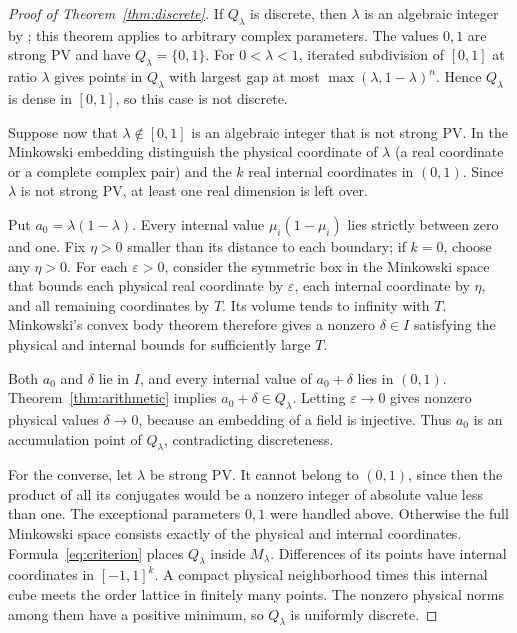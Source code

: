 \documentclass[11pt]{article}
\theoremstyle{remark}
\begin{document}
\begin{proof}[Proof of Theorem~\ref{thm:discrete}]
If $Q_\lambda$ is discrete, then $\lambda$ is an algebraic integer by \cite[Theorem~8.2]{FGH2020}; this theorem applies to arbitrary complex parameters. The values $0,1$ are strong PV and have $Q_\lambda=\{0,1\}$. For $0<\lambda<1$, iterated subdivision of $[0,1]$ at ratio $\lambda$ gives points in $Q_\lambda$ with largest gap at most $\max(\lambda,1-\lambda)^n$. Hence $Q_\lambda$ is dense in $[0,1]$, so this case is not discrete.

Suppose now that $\lambda\notin[0,1]$ is an algebraic integer that is not strong PV. In the Minkowski embedding distinguish the physical coordinate of $\lambda$ (a real coordinate or a complete complex pair) and the $k$ real internal coordinates in $(0,1)$. Since $\lambda$ is not strong PV, at least one real dimension is left over.

Put $a_0=\lambda(1-\lambda)$. Every internal value $\mu_i(1-\mu_i)$ lies strictly between zero and one. Fix $\eta>0$ smaller than its distance to each boundary; if $k=0$, choose any $\eta>0$. For each $\varepsilon>0$, consider the symmetric box in the Minkowski space that bounds each physical real coordinate by $\varepsilon$, each internal coordinate by $\eta$, and all remaining coordinates by $T$. Its volume tends to infinity with $T$. Minkowski's convex body theorem therefore gives a nonzero $\delta\in I$ satisfying the physical and internal bounds for sufficiently large $T$.

Both $a_0$ and $\delta$ lie in $I$, and every internal value of $a_0+\delta$ lies in $(0,1)$. Theorem~\ref{thm:arithmetic} implies $a_0+\delta\in Q_\lambda$. Letting $\varepsilon\to0$ gives nonzero physical values $\delta\to0$, because an embedding of a field is injective. Thus $a_0$ is an accumulation point of $Q_\lambda$, contradicting discreteness.

For the converse, let $\lambda$ be strong PV. It cannot belong to $(0,1)$, since then the product of all its conjugates would be a nonzero integer of absolute value less than one. The exceptional parameters $0,1$ were handled above. Otherwise the full Minkowski space consists exactly of the physical and internal coordinates. Formula~\eqref{eq:criterion} places $Q_\lambda$ inside $M_\lambda$. Differences of its points have internal coordinates in $[-1,1]^k$. A compact physical neighborhood times this internal cube meets the order lattice in finitely many points. The nonzero physical norms among them have a positive minimum, so $Q_\lambda$ is uniformly discrete.
\end{proof}
\end{document}
